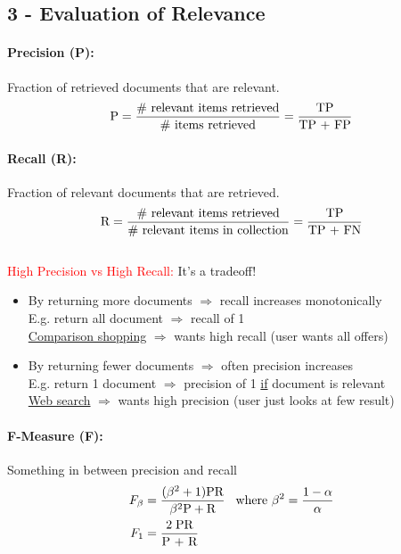 \documentclass[a4paper,11pt]{article}
\newcommand{\msection}[1]{\section{#1}\vspace{-0.5mm}}
\begin{document}
\begin{multicols}{2}
\msection{3 - Evaluation of Relevance}
\paragraph{Precision (P):} Fraction of retrieved documents that are relevant.
\[
  \text P = \frac{\# \text{ relevant items retrieved}}{\# \text{ items retrieved}} 
          = \frac{\text{TP}}{\text{TP + FP}}
\]

\paragraph{Recall (R):} Fraction of relevant documents that are retrieved.\\
\[
  \text R = \frac{\# \text{ relevant items retrieved}}{\# \text{ relevant items in collection}}
          = \frac{\text{TP}}{\text{TP + FN}}
\]
\\
\vspace{0.2cm}
\textcolor{red}{High Precision vs High Recall:} It's a tradeoff!
\begin{itemize}
  \item By returning more documents $\Rightarrow$ recall increases monotonically\\
        E.g. return all document $\Rightarrow$ recall of 1\\
        \underline{Comparison shopping} $\Rightarrow$ wants high recall (user wants all offers)
  \item By returning fewer documents $\Rightarrow$ often precision increases\\
        E.g. return 1 document $\Rightarrow$ precision of 1 \underline{if} document is relevant\\
        \underline{Web search} $\Rightarrow$ wants high precision (user just looks at few result)
\end{itemize}

\paragraph{F-Measure (F):} Something in between precision and recall
\begin{align*}
  F_{\beta} &= \frac{(\beta^2 + 1) \text{PR}}{\beta^2 \text P + \text R} \hspace{0.3cm} \text{where } \beta^2 = \frac{1 - \alpha}{\alpha} \\
  F_1 &= \frac{2 \; \text{PR}}{\text{P + R}}
\end{align*}


\end{multicols}
\end{document}
